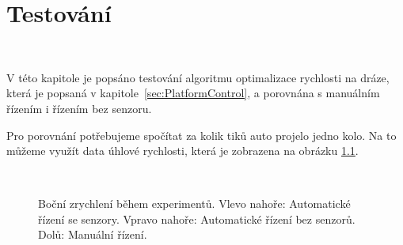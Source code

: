 \chapter{Testování}
\label{sec:Testing}
\

V této kapitole je popsáno testování algoritmu optimalizace rychlosti na dráze,
která je popsaná v kapitole~\ref{sec:PlatformControl}, a porovnána s manuálním
řízením i řízením bez senzoru.

Pro porovnání potřebujeme spočítat za kolik tiků auto projelo jedno kolo. Na to můžeme využít data
úhlové rychlosti, která je zobrazena na obrázku \ref{fig:Laps}.

\begin{figure}[!h]
    \centering
     \\
    \captionsetup{justification=centering}
    \caption{Boční zrychlení během experimentů. Vlevo nahoře: Automatické řízení se senzory. Vpravo nahoře: Automatické řízení bez senzorů. Dolů: Manuální řízení.}
    \label{fig:Laps}
\end{figure}

